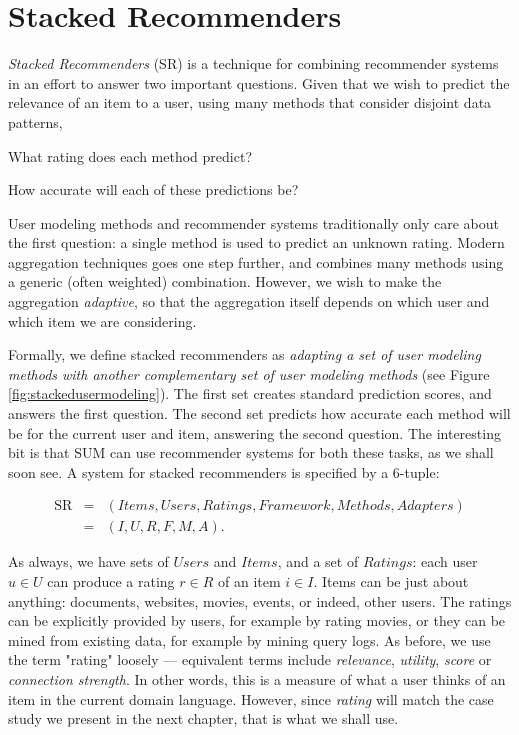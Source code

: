\section{Stacked Recommenders}
\label{sec:usermetamodeling}

\emph{Stacked Recommenders} (SR) is a technique for combining recommender systems
in an effort to answer two important questions.
Given that we wish to predict the relevance of an item to a user,
using many methods that consider disjoint data patterns,

\begin{enumerate*}
  \item What rating does each method predict?
  \item How accurate will each of these predictions be?
\end{enumerate*}

User modeling methods and recommender systems traditionally only care about the first question:
a single method is used to predict an unknown rating.
Modern aggregation techniques goes one step further, and combines many methods using a generic (often weighted) combination.
However, we wish to make the aggregation \emph{adaptive},
so that the aggregation itself depends on which user and which item we are considering.

Formally, we define stacked recommenders as \emph{adapting a set of user modeling methods
with another complementary set of user modeling methods} 
(see Figure \ref{fig:stackedusermodeling}).
The first set creates standard prediction scores, and answers the first question.
The second set predicts how accurate each method will be for the current user and item,
answering the second question.
The interesting bit is that SUM can use recommender systems for both these tasks, as we shall soon see.
A system for stacked recommenders is specified by a 6-tuple:

\begin{eqnarray*}
  \mathrm{SR} &=& (Items, Users, Ratings, Framework, Methods, Adapters)\\
              &=& (I,U,R,F,M,A).
\end{eqnarray*}
\vspace{0.2em}

\noindent
As always, we have sets of $Users$ and $Items$, 
and a set of $Ratings$: each user $u \in U$ can produce a rating $r \in R$ of an item $i \in I$.
Items can be just about anything: documents, websites, movies, events, or indeed, other users.
The ratings can be explicitly provided by users, for example by rating movies,
or they can be mined from existing data, for example by mining query logs.
As before, we use the term "rating" loosely --- equivalent terms include \emph{relevance}, \emph{utility},
\emph{score} or \emph{connection strength}. In other words, this is a measure of what a user thinks of an item
in the current domain language. However, since \emph{rating} will match the case study we present in the next chapter,
that is what we shall use. 

